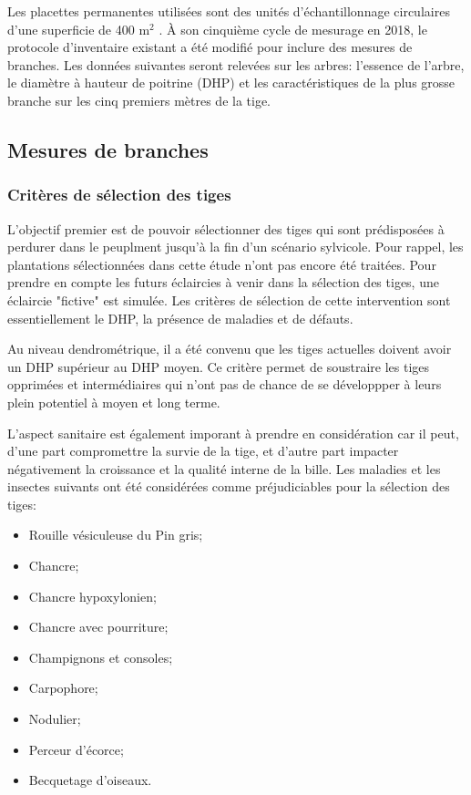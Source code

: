 \documentclass[letterpaper, 12pt]{article}
\begin{document}
\begin{onehalfspace}
Les placettes permanentes utilisées sont des unités d'échantillonnage circulaires d'une superficie de 400 m$^{2}$ \cite{MFFP2016}. À son cinquième cycle de mesurage en 2018, le protocole d'inventaire existant a été modifié pour inclure des mesures de branches. Les données suivantes seront relevées sur les arbres: l'essence de l'arbre, le diamètre à hauteur de poitrine (DHP) et les caractéristiques de la plus grosse branche sur les cinq premiers mètres de la tige. 

\subsection{Mesures de branches}

\subsubsection{Critères de sélection des tiges}

L'objectif premier est de pouvoir sélectionner des tiges qui sont prédisposées à perdurer dans le peuplment jusqu'à la fin d'un scénario sylvicole. Pour rappel, les plantations sélectionnées dans cette étude n'ont pas encore été traitées. Pour prendre en compte les futurs éclaircies à venir dans la sélection des tiges, une éclaircie "fictive" est simulée. Les critères de sélection de cette intervention sont essentiellement le DHP, la présence de maladies et de défauts. 

\vspace{12pt}

Au niveau dendrométrique, il a été convenu que les tiges actuelles doivent avoir un DHP supérieur au DHP moyen. Ce critère permet de soustraire les tiges opprimées et intermédiaires qui n'ont pas de chance de se développper à leurs plein potentiel à moyen et long terme. 

\vspace{12pt}

L'aspect sanitaire est également imporant à prendre en considération car il peut, d'une part compromettre la survie de la tige, et d'autre part impacter négativement la croissance et la qualité interne de la bille. Les maladies et les insectes suivants ont été considérées comme préjudiciables pour la sélection des tiges:

\vspace{12pt}

\begin{itemize}

\item Rouille vésiculeuse du Pin gris;
\item Chancre;
\item Chancre hypoxylonien;
\item Chancre avec pourriture;
\item Champignons et consoles;
\item Carpophore;
\item Nodulier;
\item Perceur d'écorce;
\item Becquetage d'oiseaux.
	

\end{itemize}
\end{onehalfspace}
\end{document}
